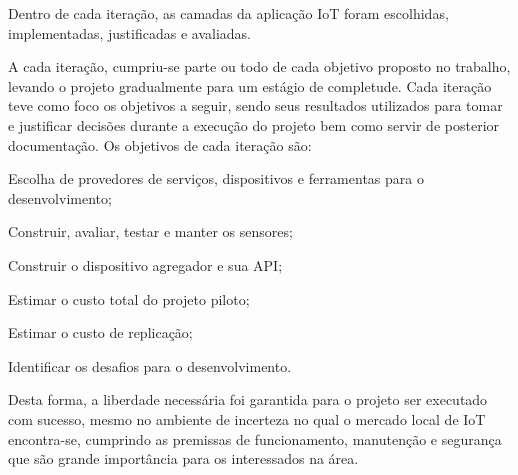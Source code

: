 Dentro de cada iteração, as camadas da aplicação IoT foram escolhidas,
implementadas, justificadas e avaliadas.

A cada iteração, cumpriu-se parte ou todo de cada objetivo proposto no trabalho,
levando o projeto gradualmente para um estágio de completude.
Cada iteração teve como foco os objetivos a seguir, sendo seus resultados
utilizados para tomar e justificar decisões durante a execução do
projeto bem como servir de posterior documentação. Os objetivos de cada iteração
são:

\begin{alineas}

	\item Escolha de provedores de serviços, dispositivos e ferramentas para o
desenvolvimento;

	\item Construir, avaliar, testar e manter os sensores;

	\item Construir o dispositivo agregador e sua API;

	\item Estimar o custo total do projeto piloto;

	\item Estimar o custo de replicação;

	\item Identificar os desafios para o desenvolvimento.

\end{alineas}

Desta forma, a liberdade necessária foi garantida para o projeto ser
executado com sucesso, mesmo no ambiente de incerteza no qual o mercado local de
IoT encontra-se, cumprindo as premissas de funcionamento, manutenção e
segurança que são grande importância para os interessados na área.
